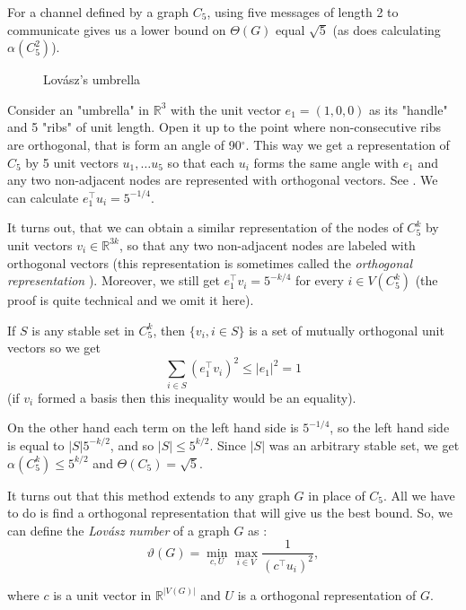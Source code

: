 For a channel defined by a graph $C_5$, using five messages of length 2 to communicate gives us a lower bound on $\Theta(G)$ equal $\sqrt{5}$ (as does calculating $\alpha(C_5^2)$).

\begin{wrapfigure}{l}{0.4\textwidth}
  
  \caption{Lovász's umbrella}
  \label{fig:umbrella}
\end{wrapfigure}

Consider an "umbrella" in $\mathbb{R}^3$ with the unit vector $e_1 = (1, 0, 0)$ as its "handle" and 5 "ribs" of unit length.  Open it up to the point where non-consecutive ribs are orthogonal, that is form an angle of 90$^\circ$. This way we get a representation of $C_5$ by 5 unit vectors $u_1, \ldots u_5$ so that each $u_i$ forms the same angle with $e_1$ and any two non-adjacent nodes are represented with orthogonal vectors. See . We can calculate $e_1^\intercal u_i = 5 ^ {-1/4}$.

It turns out, that we can obtain a similar representation of the nodes of $C_5^k$ by unit vectors $v_i \in \mathbb{R}^{3k}$, so that any two non-adjacent nodes are labeled with orthogonal vectors (this representation is sometimes called the \emph{orthogonal representation} \cite{Lovsz1989Orthogonal}). Moreover, we still get $e_1^\intercal v_i = 5^{-k/4}$ for every $i \in V(C_5^k)$ (the proof is quite technical and we omit it here).

If $S$ is any stable set in $C_5^k$, then $\{v_i, i \in S\}$ is a set of mutually orthogonal unit vectors so we get 
$$\sum\limits_{i\in S}(e_1^\intercal v_i)^2 \leq |e_1|^2 = 1$$
(if $v_i$ formed a basis then this inequality would be an equality).

On the other hand each term on the left hand side is $5^{-1/4}$, so the left hand side is equal to $|S|5^{-k/2}$, and so $|S| \leq 5^{k/2}$. Since $|S|$ was an arbitrary stable set, we get $\alpha(C_5^k) \leq 5 ^{k/2}$ and $\Theta(C_5) = \sqrt{5}$.

It turns out that this method extends to any graph $G$ in place of $C_5$. All we have to do is find a orthogonal representation that will give us the best bound. So, we can define the \emph{Lovász number} of a graph $G$ as :
$$\vartheta(G) = \min\limits_{c,U} \max\limits_{i\in V} \frac{1}{(c^\intercal u_i)^2},$$

\noindent where $c$ is a unit vector in $\mathbb{R}^{|V(G)|}$ and $U$ is a orthogonal representation of $G$.

